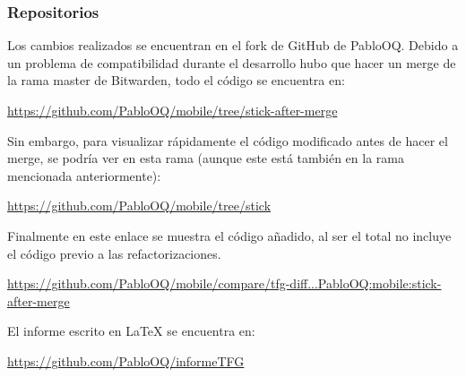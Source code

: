 \subsubsection{Repositorios}\label{repos}
Los cambios realizados se encuentran en el fork de GitHub de PabloOQ.
Debido a un problema de compatibilidad durante el desarrollo hubo que hacer un merge de la rama master de Bitwarden, todo el código se encuentra en:

\noindent\url{https://github.com/PabloOQ/mobile/tree/stick-after-merge}

\noindent Sin embargo, para visualizar rápidamente el código modificado antes de hacer el merge, se podría ver en esta rama (aunque este está también en la rama mencionada anteriormente):

\noindent\url{https://github.com/PabloOQ/mobile/tree/stick}

\noindent Finalmente en este enlace se muestra el código añadido, al ser el total no incluye el código previo a las refactorizaciones.

\noindent\url{https://github.com/PabloOQ/mobile/compare/tfg-diff...PabloOQ:mobile:stick-after-merge}

\noindent El informe escrito en LaTeX se encuentra en:

\noindent\url{https://github.com/PabloOQ/informeTFG}
\newpage

